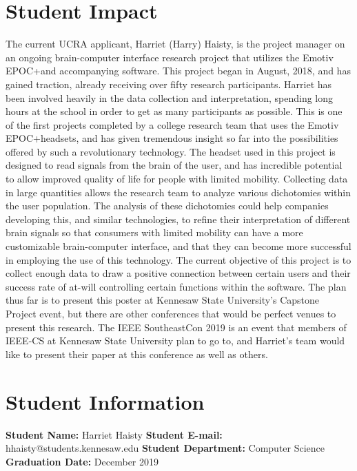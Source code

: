 \documentclass{article}
\begin{document}
\section*{Student Impact}
The current UCRA applicant, Harriet (Harry) Haisty, is the project manager on an ongoing brain-computer interface research project that utilizes the Emotiv EPOC+\texttrademark and accompanying software. This project began in August, 2018, and has gained traction, already receiving over fifty research participants. Harriet has been involved heavily in the data collection and interpretation, spending long hours at the school in order to get as many participants as possible. 
\newline \newline
This is one of the first projects completed by a college research team that uses the Emotiv EPOC+\texttrademark headsets, and has given tremendous insight so far into the possibilities offered by such a revolutionary technology. The headset used in this project is designed to read signals from the brain of the user, and has incredible potential to allow improved quality of life for people with limited mobility. Collecting data in large quantities allows the research team to analyze various dichotomies within the user population. 
\newline \newline
The analysis of these dichotomies could help companies developing this, and similar technologies, to refine their interpretation of different brain signals so that consumers with limited mobility can have a more customizable brain-computer interface, and that they can become more successful in employing the use of this technology. 
\newline \newline
The current objective of this project is to collect enough data to draw a positive connection between certain users and their success rate of at-will controlling certain functions within the software. The plan thus far is to present this poster at Kennesaw State University's Capstone Project event, but there are other conferences that would be perfect venues to present this research. The IEEE SoutheastCon 2019 is an event that members of IEEE-CS at Kennesaw State University plan to go to, and Harriet's team would like to present their paper at this conference as well as others. 



\section*{Student Information}
\textbf{Student Name:} Harriet Haisty \newline
\textbf{Student E-mail:} hhaisty@students.kennesaw.edu \newline
\textbf{Student Department:} Computer Science \newline
\textbf{Graduation Date:} December 2019
\end{document}
